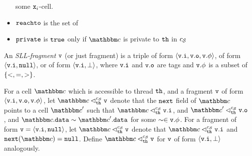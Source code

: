 \begin{itemize}
\begin{inparaenum}[(i)]
    some $\mathtt{x}_i$-cell.
  \end{inparaenum}
\item
  $\mathtt{reachto}$ is the set of
\item
  $\mathtt{private}$ is ${\tt true}$ only if $\cell$ is private to ${\tt th}$ in $c_{\mathcal S}$
\end{itemize}


\begin{definition}
\label{def:sll-fragment}
An {\em SLL-fragment} $\mathtt{v}$ (or just fragment)
is a triple of form
$\left\langle\mathtt{v}.\mathtt{i},\mathtt{v}.\mathtt{o},\mathtt{v}.\phi\right\rangle$, of form
$\left\langle\mathtt{v}.\mathtt{i},{\tt null}\right\rangle$, or of form
$\left\langle\mathtt{v}.\mathtt{i},\bot\right\rangle$,
where $\mathtt{v}.\mathtt{i}$ and $\mathtt{v}.\mathtt{o}$ are tags
    and $\mathtt{v}.\phi$ is a subset of $\left\{<, =, >\right\}$.
\end{definition}

For a cell $\cell$ which is accessible to thread ${\tt th}$, and a fragment
$\mathtt{v}$ of form $\left\langle\mathtt{v}.\mathtt{i},\mathtt{v}.\mathtt{o},\mathtt{v}.\phi\right\rangle$, let $\cell \satfrag{\thread}{\sconf}\frag$ denote that
the ${\tt next}$ field of $\cell$ points to a cell $\cell'$ such that
  $\cell \satfrag{\thread}{\sconf} \inat{\frag}$,
and
$\cell' \satfrag{\thread}{\sconf} \outat{\frag}$, and 
  $\cell.\mathtt{data} \sim \cell'.\mathtt{data}$ for some $\sim \in \mathtt{v}.\phi$.
For a fragment of form $\mathtt{v} = \left\langle\mathtt{v}.\mathtt{i},{\tt null}\right\rangle$, let
$\cell \satfrag{\thread}{\sconf} \frag$ denote that
$\cell \satfrag{\thread}{\sconf} \inat{\frag}$ and $\mathtt{next}(\cell) = \nullconst$.
Define $\cell \satfrag{\thread}{\sconf} \frag$ for $\mathtt{v}$ of form $\left\langle\mathtt{v}.\mathtt{i},\bot\right\rangle$
analogously.

